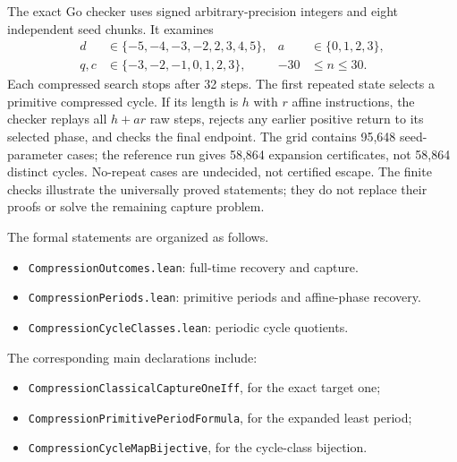 \documentclass[11pt,letterpaper]{article}
\begin{document}
The exact Go checker uses signed arbitrary-precision integers and eight
independent seed chunks. It examines
\[
\begin{aligned}
d&\in\{-5,-4,-3,-2,2,3,4,5\},& a&\in\{0,1,2,3\},\\
q,c&\in\{-3,-2,-1,0,1,2,3\},& -30&\le n\le30.
\end{aligned}
\]
Each compressed search stops after 32 steps. The first repeated state selects
a primitive compressed cycle. If its length is \(h\) with \(r\) affine
instructions, the checker replays all \(h+ar\) raw steps, rejects any earlier
positive return to its selected phase, and checks the final endpoint.
The grid contains 95,648 seed-parameter cases; the reference run gives 58,864
expansion certificates, not 58,864 distinct cycles. No-repeat cases are
undecided, not certified escape. The finite checks illustrate the universally
proved statements; they do not replace their proofs or solve the remaining
capture problem.

The formal statements are organized as follows.
\begin{itemize}
\item \texttt{CompressionOutcomes.lean}: full-time recovery and capture.
\item \texttt{CompressionPeriods.lean}: primitive periods and affine-phase recovery.
\item \texttt{CompressionCycleClasses.lean}: periodic cycle quotients.
\end{itemize}
The corresponding main declarations include:
\begin{itemize}
\item \texttt{CompressionClassicalCaptureOneIff}, for the exact target one;
\item \texttt{CompressionPrimitivePeriodFormula}, for the expanded least period;
\item \texttt{CompressionCycleMapBijective}, for the cycle-class bijection.
\end{itemize}



\end{document}
